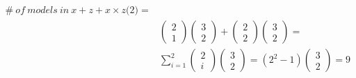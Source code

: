 \begin{equation*}
\begin{aligned}
\#\ of\ models\ in\ x + z +x \times z\textit{(2)}=\\
& \left( \begin{array}{c}
2 \\ 
1 \end{array}
\right)\left( \begin{array}{c}
3 \\ 
2 \end{array}
\right)+\left( \begin{array}{c}
2 \\ 
2 \end{array}
\right)\left( \begin{array}{c}
3 \\ 
2 \end{array}
\right)=\\
&\sum^2_{i=1}{\left( \begin{array}{c}
2 \\ 
i \end{array}
\right)}\left( \begin{array}{c}
3 \\ 
2 \end{array}
\right)=\left(2^2-1\right)\left( \begin{array}{c}
3 \\ 
2 \end{array}
\right)=9

\end{aligned}
\end{equation*}


